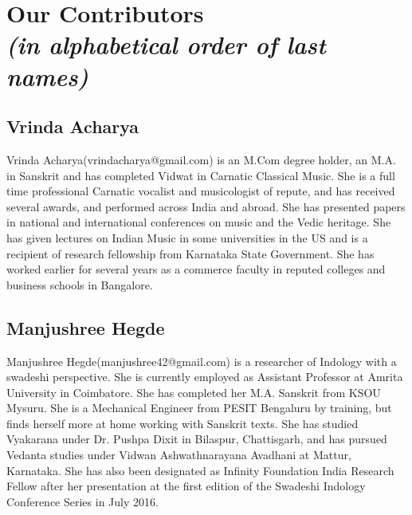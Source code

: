 \makeatletter
\def\@makeschapterhead#1{%
  \vspace*{50\p@}%
  {\parindent \z@ \raggedright
    \normalfont
    \interlinepenalty\@M
    \LARGE \bfseries  #1\par\nobreak
    \vskip 20\p@
  }}
\makeatother

\chapter*{Our Contributors\\ {\rm\sl\small (in alphabetical order of last names)}}\label{contributors}

\lhead[\small\thepage]{}
\rhead[]{\small\thepage}
\chead[]{}
\cfoot[]{}

\section*{Vrinda Acharya}

Vrinda Acharya(vrindacharya@gmail.com) is an M.Com degree holder, an M.A. in Sanskrit and has completed Vidwat in Carnatic Classical Music. She is a full time professional Carnatic vocalist and musicologist of repute, and has received several awards, and performed across India and abroad. She has presented papers in national and international conferences on music and the Vedic heritage. She has given lectures on Indian Music in some universities in the US and is a recipient of research fellowship from Karnataka State Government. She has worked earlier for several years as a commerce faculty in reputed colleges and business schools in Bangalore.

\section*{Manjushree Hegde}

Manjushree Hegde(manjushree42@gmail.com) is a researcher of Indology with a swadeshi perspective. She is currently employed as Assistant Professor at Amrita University in Coimbatore. She has completed her M.A. Sanskrit from KSOU Mysuru. She is a Mechanical Engineer from PESIT Bengaluru by training, but finds herself more at home working with Sanskrit texts. She has studied Vyakarana under Dr. Pushpa Dixit in Bilaspur, Chattisgarh, and has pursued Vedanta studies under Vidwan Ashwathnarayana Avadhani at Mattur, Karnataka. She has also been designated as Infinity Foundation India Research Fellow after her presentation at the first edition of the Swadeshi Indology Conference Series in July 2016.

